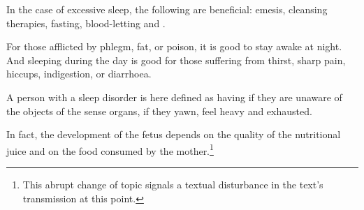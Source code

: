 \begin{translation}
%
%
%
%
%
%
%

\item[47]

\begin{sloka}
    In the case of excessive sleep, the following are beneficial:
emesis, cleansing therapies, fasting, blood-letting and
.
\end{sloka}

\item[48]

\begin{sloka}
    For those afflicted by phlegm, fat, or poison, it is good to stay awake at
night. And sleeping during the day is good 
for those suffering from thirst, sharp pain, hiccups,
indigestion, or diarrhoea.
\end{sloka}

\item[49]

\begin{sloka}
    A person with a sleep disorder is here defined as having
 if they are unaware of the objects of the sense
organs, if they yawn, feel heavy and exhausted.
\end{sloka}

\item[57]

In fact, the development of the fetus depends on the quality of the
nutritional juice and on the food consumed by the
mother.\footnote{This abrupt change of topic signals a textual disturbance in
    the text's transmission at this point.}




\end{translation}
